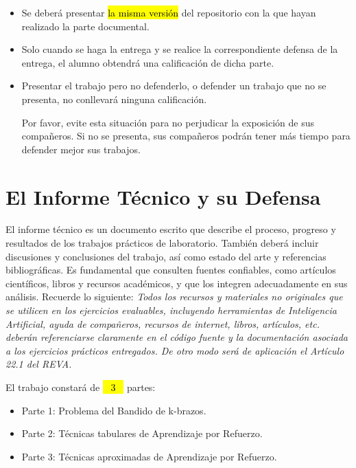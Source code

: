 \documentclass[a4paper, 11pt]{article}
\begin{document}
\begin{importantbox}
\begin{itemize} \small

\item Se deberá presentar \hl{la misma versión} del repositorio con la que hayan realizado la parte documental. 



\item Solo cuando se haga la entrega y se realice la correspondiente defensa de la entrega, el alumno obtendrá una calificación de dicha parte. 

\item Presentar el trabajo pero no defenderlo, o defender un trabajo que no se presenta, no conllevará ninguna calificación.

Por favor, evite esta situación para  no perjudicar la exposición de sus compañeros. Si no se presenta, sus compañeros podrán tener más tiempo para defender mejor sus trabajos.

\end{itemize}
\end{importantbox}

\newpage

\section{El Informe Técnico y su Defensa}

El informe técnico es un documento escrito que describe el proceso, progreso y resultados de los trabajos prácticos de laboratorio. También deberá incluir discusiones y conclusiones del trabajo, así como estado del arte y referencias bibliográficas. Es fundamental que consulten fuentes confiables, como artículos científicos, libros y recursos académicos, y que los integren adecuadamente en sus análisis. Recuerde lo siguiente:
{\it
Todos los recursos y materiales no originales que se utilicen en los ejercicios evaluables, incluyendo herramientas de Inteligencia Artificial, ayuda de compañeros, recursos de internet, libros, artículos, etc. deberán referenciarse claramente en el código fuente y la documentación asociada a los ejercicios prácticos entregados. De otro modo será de aplicación el Artículo 22.1 del REVA.}


El trabajo constará de \hl{~ 3 ~} partes:
\begin{itemize}
\item Parte 1: Problema del Bandido de k-brazos.
\item Parte 2: Técnicas tabulares de Aprendizaje por Refuerzo.
\item Parte 3: Técnicas aproximadas de Aprendizaje por Refuerzo.
\end{itemize}
\end{document}

